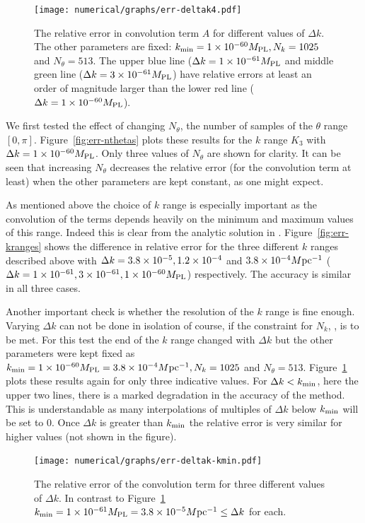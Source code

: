 \begin{figure}
 \centering
 \texttt{[image: numerical/graphs/err-deltak4.pdf]}
 \caption{The relative error in convolution term $A$ for different values of $\Delta k$.
The other parameters are fixed: $k_{\mathrm{min}}=1\times10^{-60}M_{\mathrm{PL}}, N_k = 1025$ and $N_\theta=513$. The
upper 
blue line ($\Delta k=1\times 10^{-61}M_{\mathrm{PL}}$ and middle green line ($\Delta k=3\times 10^{-61}M_{\mathrm{PL}}$) have relative
errors at
least an order of magnitude larger than the lower red line ($\Delta k=1\times 10^{-60}M_{\mathrm{PL}}$).}
 \label{fig:err-deltaks}
\end{figure}


We first tested the effect of changing $N_\theta$, the number of
samples of the $\theta$ range $[0,\pi]$.  Figure~\ref{fig:err-nthetas}
plots these results for the $k$ range $K_3$ with $\Delta k =
1\times 10^{-60}M_{\mathrm{PL}}$. Only three values of $N_\theta$ are shown for clarity. It
can be seen that increasing $N_\theta$ decreases the relative error (for the convolution
term at least) when the other parameters are kept constant, as one
might expect.


As mentioned above the choice of $k$ range is especially important as
the convolution of the terms depends heavily on the minimum and
maximum values of this range. Indeed this is clear from the analytic
solution in . Figure~\ref{fig:err-kranges}
shows the difference in relative error for the three different $k$
ranges described above with 
$\Delta k= 3.8\times 10^{-5}, 1.2\times 10^{-4}$ and $3.8\times 10^{-4}M \mathrm{pc}^{-1}$
($\Delta k= 1\times 10^{-61}, 3\times 10^{-61},1\times 10^{-60}M_{\mathrm{PL}}$)
respectively. The accuracy is similar in all three cases.


Another important check is whether the resolution of the $k$ range is
fine enough. Varying $\Delta k$ can not be done in isolation of
course, if the constraint for $N_k$, ,
is to
be met. For this test the end of the $k$ range changed with $\Delta k$
but the other parameters were kept fixed as $k_{\mathrm{min}}=1\times 10^{-60}M_{\mathrm{PL}}=3.8\times 10^{-4}M \mathrm{pc}^{-1},
N_k = 1025$ and $N_\theta=513$. Figure~\ref{fig:err-deltaks} plots
these results again for only three indicative values.  For $\Delta
k<k_{\mathrm{min}}$, here the upper two lines, there is a marked degradation in
the accuracy of the method. This is understandable as many
interpolations of multiples of $\Delta k$ below $k_{\mathrm{min}}$ will be set to
$0$. Once $\Delta k$ is greater than $k_{\mathrm{min}}$ the relative error is
very similar for higher values (not shown in the figure).


\begin{figure}
 \centering
 \texttt{[image: numerical/graphs/err-deltak-kmin.pdf]}
 \caption{The relative error of the convolution term for three different values of $\Delta k$. In
contrast to Figure~\ref{fig:err-deltaks} $k_{\mathrm{min}}=1\times 10^{-61}M_{\mathrm{PL}}=3.8\times 10^{-5}M \mathrm{pc}^{-1} \le \Delta k$ for
each.}
 \label{fig:err-deltak-kmin}
\end{figure}


